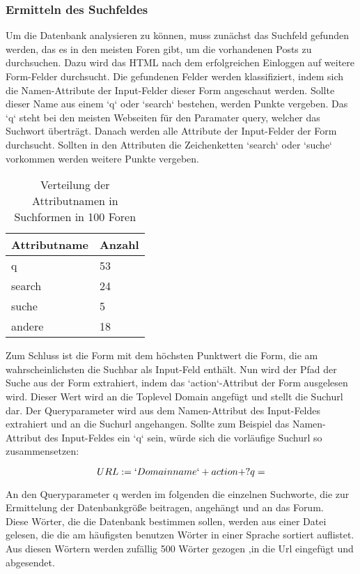 \subsubsection{Ermitteln des Suchfeldes}
Um die Datenbank analysieren zu können, muss zunächst das Suchfeld gefunden werden, das es in den meisten Foren gibt, um die vorhandenen Posts zu durchsuchen.
Dazu wird das HTML nach dem erfolgreichen Einloggen auf weitere Form-Felder durchsucht. Die gefundenen Felder werden klassifiziert, indem sich die Namen-Attribute der Input-Felder dieser Form angeschaut werden. Sollte dieser Name aus einem `q` oder `search` bestehen, werden Punkte vergeben. Das `q` steht bei den meisten Webseiten für den Paramater query, welcher das Suchwort überträgt.
Danach werden alle Attribute der Input-Felder der Form durchsucht. Sollten in den Attributen die Zeichenketten `search` oder `suche` vorkommen werden weitere Punkte vergeben.

\begin{table}[h!]
\centering 
\begin{tabular}{ | p{3cm} | p{3cm}|} \hline
Attributname & Anzahl \\ \hline
q & 53 \\ \hline
search & 24 \\ \hline
suche & 5 \\ \hline
andere & 18 \\ \hline
\end{tabular}
\caption{Verteilung der Attributnamen in Suchformen in 100 Foren}
\end{table}

Zum Schluss ist die Form mit dem höchsten Punktwert die Form, die am wahrscheinlichsten die Suchbar als Input-Feld enthält.
Nun wird der Pfad der Suche aus der Form extrahiert, indem das `action`-Attribut der Form ausgelesen wird. Dieser Wert wird an die Toplevel Domain angefügt und stellt die Suchurl dar. Der Queryparameter wird aus dem Namen-Attribut des Input-Feldes extrahiert und an die Suchurl angehangen. Sollte zum Beispiel das Namen-Attribut des Input-Feldes ein `q` sein, würde sich die vorläufige Suchurl so zusammensetzen:

\[ URL := `Domainname` + action + ?q= \]

An den Queryparameter q werden im folgenden die einzelnen Suchworte, die zur Ermittelung der Datenbankgröße beitragen, angehängt und an das Forum.\\
Diese Wörter, die die Datenbank bestimmen sollen, werden aus einer Datei gelesen, die die am häufigsten benutzen Wörter in einer Sprache sortiert auflistet. Aus diesen Wörtern werden zufällig 500 Wörter gezogen ,in die Url eingefügt und abgesendet.

